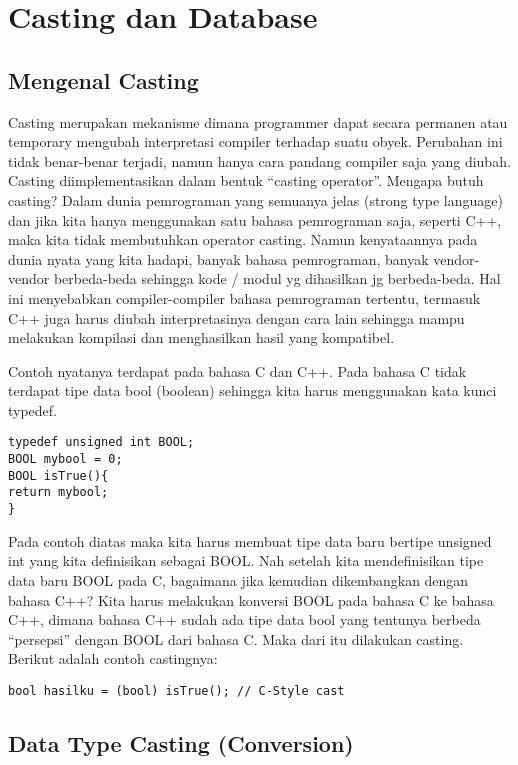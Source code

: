 \section{Casting dan Database}\label{casting-dan-database}

\subsection{Mengenal Casting}\label{mengenal-casting}

Casting merupakan mekanisme dimana programmer dapat secara permanen atau
temporary mengubah interpretasi compiler terhadap suatu obyek. Perubahan
ini tidak benar-benar terjadi, namun hanya cara pandang compiler saja
yang diubah. Casting diimplementasikan dalam bentuk ``casting
operator''. Mengapa butuh casting? Dalam dunia pemrograman yang semuanya
jelas (strong type language) dan jika kita hanya menggunakan satu bahasa
pemrograman saja, seperti C++, maka kita tidak membutuhkan operator
casting. Namun kenyataannya pada dunia nyata yang kita hadapi, banyak
bahasa pemrograman, banyak vendor-vendor berbeda-beda sehingga kode /
modul yg dihasilkan jg berbeda-beda. Hal ini menyebabkan
compiler-compiler bahasa pemrograman tertentu, termasuk C++ juga harus
diubah interpretasinya dengan cara lain sehingga mampu melakukan
kompilasi dan menghasilkan hasil yang kompatibel.

Contoh nyatanya terdapat pada bahasa C dan C++. Pada bahasa C tidak
terdapat tipe data bool (boolean) sehingga kita harus menggunakan kata
kunci typedef.

\begin{verbatim}
typedef unsigned int BOOL;
BOOL mybool = 0;
BOOL isTrue(){
return mybool;
}
\end{verbatim}

Pada contoh diatas maka kita harus membuat tipe data baru bertipe
unsigned int yang kita definisikan sebagai BOOL. Nah setelah kita
mendefinisikan tipe data baru BOOL pada C, bagaimana jika kemudian
dikembangkan dengan bahasa C++? Kita harus melakukan konversi BOOL pada
bahasa C ke bahasa C++, dimana bahasa C++ sudah ada tipe data bool yang
tentunya berbeda ``persepsi'' dengan BOOL dari bahasa C. Maka dari itu
dilakukan casting. Berikut adalah contoh castingnya:

\begin{verbatim}
bool hasilku = (bool) isTrue(); // C-Style cast
\end{verbatim}

\subsection{Data Type Casting
(Conversion)}\label{data-type-casting-conversion}

